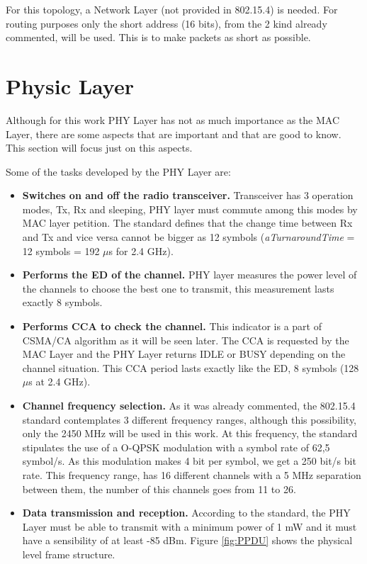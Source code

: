 For this topology, a Network Layer (not provided in 802.15.4) is needed. For routing purposes only the short address (16 bits),
from the 2 kind already commented, will be used. This is to make packets as short as possible.

\section{Physic Layer}

Although for this work \ac{PHY} Layer has not as much importance as the \ac{MAC} Layer, there are some aspects that are important and 
that are good to know. This section will focus just on this aspects.

Some of the tasks developed by the \ac{PHY} Layer are:

\begin{itemize}
 \item \textbf{Switches on and off the radio transceiver.} Transceiver has 3 operation modes, \ac{Tx}, \ac{Rx} and sleeping, \ac{PHY}
layer must commute among this modes by \ac{MAC} layer petition. The standard defines that the change time between \ac{Rx} and 
\ac{Tx} and vice versa cannot be bigger as 12 symbols (\textit{aTurnaroundTime} = 12 symbols = 192 $\mu$s for 2.4 GHz).
 \item \textbf{Performs the \ac{ED} of the channel.} \ac{PHY} layer measures the power level of the channels to choose the best one
to transmit, this measurement lasts exactly 8 symbols.
 \item \textbf{Performs \ac{CCA} to check the channel.} This indicator is a part of \ac{CSMA/CA} algorithm as it will be seen later. The
\ac{CCA} is requested by the \ac{MAC} Layer and the \ac{PHY} Layer returns IDLE or BUSY depending on the channel situation. This \ac{CCA}
period lasts exactly like the \ac{ED}, 8 symbols (128 $\mu$s at 2.4 GHz).
 \item \textbf{Channel frequency selection.} As it was already commented, the 802.15.4 standard contemplates 3 different frequency 
ranges, although this possibility, only the 2450 MHz will be used in this work. At this frequency, the standard stipulates 
the use of a \ac{O-QPSK} modulation with a symbol rate of 62,5 symbol/s. As this modulation makes 4 bit per symbol, we get 
a 250 bit/s bit rate. This frequency range, has 16 different channels with a 5 MHz separation between them, the number of 
this channels goes from 11 to 26.
 \item \textbf{Data transmission and reception.} According to the standard, the \ac{PHY} Layer must be able to transmit with a minimum
power of 1 mW and it must have a sensibility of at least -85 dBm. Figure \ref{fig:PPDU} shows the physical level frame structure.


\end{itemize}
